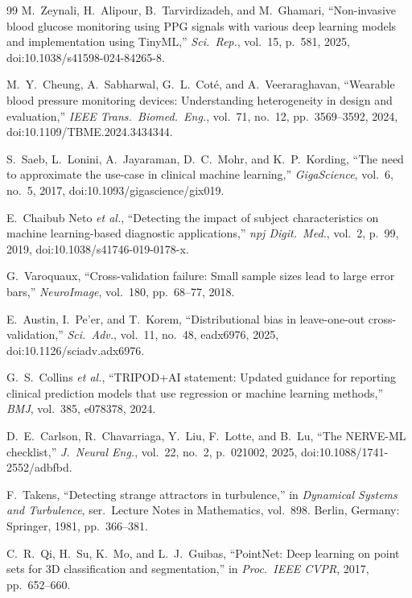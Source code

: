 \begin{thebibliography}{99}
M.~Zeynali, H.~Alipour, B.~Tarvirdizadeh, and M.~Ghamari, ``Non-invasive
blood glucose monitoring using PPG signals with various deep learning models
and implementation using TinyML,'' \emph{Sci.\ Rep.}, vol.~15, p.~581, 2025,
doi:10.1038/s41598-024-84265-8.

M.~Y.~Cheung, A.~Sabharwal, G.~L.~Cot\'e, and A.~Veeraraghavan, ``Wearable
blood pressure monitoring devices: Understanding heterogeneity in design and
evaluation,'' \emph{IEEE Trans.\ Biomed.\ Eng.}, vol.~71,
no.~12, pp.~3569--3592, 2024, doi:10.1109/TBME.2024.3434344.

S.~Saeb, L.~Lonini, A.~Jayaraman, D.~C.~Mohr, and K.~P.~Kording, ``The need
to approximate the use-case in clinical machine learning,''
\emph{GigaScience}, vol.~6, no.~5, 2017, doi:10.1093/gigascience/gix019.

E.~Chaibub Neto \emph{et al.}, ``Detecting the impact of subject
characteristics on machine learning-based diagnostic applications,''
\emph{npj Digit.\ Med.}, vol.~2, p.~99, 2019, doi:10.1038/s41746-019-0178-x.

G.~Varoquaux, ``Cross-validation failure: Small sample sizes lead to large
error bars,'' \emph{NeuroImage}, vol.~180, pp.~68--77, 2018.

E.~Austin, I.~Pe'er, and T.~Korem, ``Distributional bias in leave-one-out
cross-validation,'' \emph{Sci.\ Adv.}, vol.~11, no.~48, eadx6976, 2025,
doi:10.1126/sciadv.adx6976.

G.~S.~Collins \emph{et al.}, ``TRIPOD+AI statement: Updated guidance for
reporting clinical prediction models that use regression or machine
learning methods,'' \emph{BMJ}, vol.~385, e078378, 2024.

D.~E.~Carlson, R.~Chavarriaga, Y.~Liu, F.~Lotte, and B.~Lu, ``The NERVE-ML
checklist,'' \emph{J.\ Neural Eng.}, vol.~22, no.~2, p.~021002, 2025,
doi:10.1088/1741-2552/adbfbd.

F.~Takens, ``Detecting strange attractors in turbulence,'' in
\emph{Dynamical Systems and Turbulence}, ser.\ Lecture Notes in Mathematics,
vol.~898.  Berlin, Germany: Springer, 1981, pp.~366--381.

C.~R.~Qi, H.~Su, K.~Mo, and L.~J.~Guibas, ``PointNet: Deep learning on point
sets for 3D classification and segmentation,'' in \emph{Proc.\ IEEE CVPR},
2017, pp.~652--660.


\end{thebibliography}
